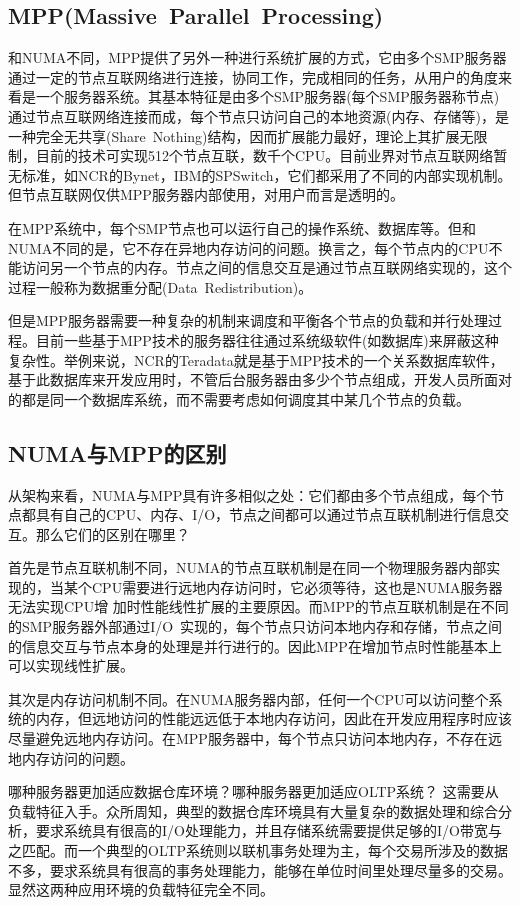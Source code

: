\subsection{MPP(Massive Parallel Processing)}
和NUMA不同，MPP提供了另外一种进行系统扩展的方式，它由多个SMP服务器通过一定的节点互联网络进行连接，协同工作，完成相同的任务，从用户的角度来看是一个服务器系统。其基本特征是由多个SMP服务器(每个SMP服务器称节点)通过节点互联网络连接而成，每个节点只访问自己的本地资源(内存、存储等)，是一种完全无共享(Share Nothing)结构，因而扩展能力最好，理论上其扩展无限制，目前的技术可实现512个节点互联，数千个CPU。目前业界对节点互联网络暂无标准，如NCR的Bynet，IBM的SPSwitch，它们都采用了不同的内部实现机制。但节点互联网仅供MPP服务器内部使用，对用户而言是透明的。

在MPP系统中，每个SMP节点也可以运行自己的操作系统、数据库等。但和NUMA不同的是，它不存在异地内存访问的问题。换言之，每个节点内的CPU不能访问另一个节点的内存。节点之间的信息交互是通过节点互联网络实现的，这个过程一般称为数据重分配(Data Redistribution)。

但是MPP服务器需要一种复杂的机制来调度和平衡各个节点的负载和并行处理过程。目前一些基于MPP技术的服务器往往通过系统级软件(如数据库)来屏蔽这种复杂性。举例来说，NCR的Teradata就是基于MPP技术的一个关系数据库软件，基于此数据库来开发应用时，不管后台服务器由多少个节点组成，开发人员所面对的都是同一个数据库系统，而不需要考虑如何调度其中某几个节点的负载。


\subsection{NUMA与MPP的区别}
从架构来看，NUMA与MPP具有许多相似之处：它们都由多个节点组成，每个节点都具有自己的CPU、内存、I/O，节点之间都可以通过节点互联机制进行信息交互。那么它们的区别在哪里？


首先是节点互联机制不同，NUMA的节点互联机制是在同一个物理服务器内部实现的，当某个CPU需要进行远地内存访问时，它必须等待，这也是NUMA服务器无法实现CPU增
加时性能线性扩展的主要原因。而MPP的节点互联机制是在不同的SMP服务器外部通过I/O 实现的，每个节点只访问本地内存和存储，节点之间的信息交互与节点本身的处理是并行进行的。因此MPP在增加节点时性能基本上可以实现线性扩展。

其次是内存访问机制不同。在NUMA服务器内部，任何一个CPU可以访问整个系统的内存，但远地访问的性能远远低于本地内存访问，因此在开发应用程序时应该尽量避免远地内存访问。在MPP服务器中，每个节点只访问本地内存，不存在远地内存访问的问题。


哪种服务器更加适应数据仓库环境？哪种服务器更加适应OLTP系统？
这需要从负载特征入手。众所周知，典型的数据仓库环境具有大量复杂的数据处理和综合分析，要求系统具有很高的I/O处理能力，并且存储系统需要提供足够的I/O带宽与之匹配。而一个典型的OLTP系统则以联机事务处理为主，每个交易所涉及的数据不多，要求系统具有很高的事务处理能力，能够在单位时间里处理尽量多的交易。显然这两种应用环境的负载特征完全不同。 

